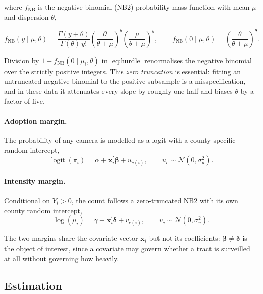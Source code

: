 where $f_{\mathrm{NB}}$ is the negative binomial (NB2) probability mass
function with mean $\mu$ and dispersion $\theta$,

\begin{equation}
f_{\mathrm{NB}}(y \mid \mu, \theta) =
\frac{\Gamma(y + \theta)}{\Gamma(\theta)\, y!}
\left(\frac{\theta}{\theta + \mu}\right)^{\!\theta}
\left(\frac{\mu}{\theta + \mu}\right)^{\!y},
\qquad
f_{\mathrm{NB}}(0 \mid \mu, \theta) =
\left(\frac{\theta}{\theta + \mu}\right)^{\!\theta}.
\end{equation}

Division by $1 - f_{\mathrm{NB}}(0 \mid \mu_i,\theta)$ in
\eqref{eq:hurdle} renormalises the negative binomial over the strictly positive
integers. This \emph{zero truncation} is essential: fitting an untruncated
negative binomial to the positive subsample is a misspecification, and in these
data it attenuates every slope by roughly one half and biases $\theta$ by a
factor of five.

\paragraph{Adoption margin.} The probability of any camera is modelled as a
logit with a county-specific random intercept,
\begin{equation}
\operatorname{logit}(\pi_i)
 = \alpha + \mathbf{x}_i^{\prime}\boldsymbol{\beta} + u_{c(i)},
\qquad u_c \sim \mathcal{N}(0, \sigma_u^2).
\label{eq:part1}
\end{equation}

\paragraph{Intensity margin.} Conditional on $Y_i>0$, the count follows a
zero-truncated NB2 with its own county random intercept,
\begin{equation}
\log(\mu_i)
 = \gamma + \mathbf{x}_i^{\prime}\boldsymbol{\delta} + v_{c(i)},
\qquad v_c \sim \mathcal{N}(0, \sigma_v^2).
\label{eq:part2}
\end{equation}

The two margins share the covariate vector $\mathbf{x}_i$ but not its
coefficients: $\boldsymbol{\beta} \neq \boldsymbol{\delta}$ is the object of
interest, since a covariate may govern whether a tract is surveilled at all
without governing how heavily.

\subsection{Estimation}

